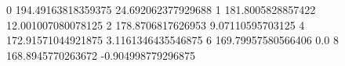 0 194.49163818359375 24.692062377929688
1 181.8005828857422 12.001007080078125
2 178.8706817626953 9.07110595703125
4 172.91571044921875 3.1161346435546875
6 169.79957580566406 0.0
8 168.8945770263672 -0.904998779296875
